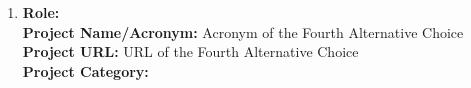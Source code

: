 \documentclass[runningheads]{llncs}
\begin{document}
\begin{description}
\begin{enumerate}
       \item \textbf{Role:}
\\
                \textbf{Project Name/Acronym:} Acronym of the Fourth Alternative Choice\\
                \textbf{Project URL:} URL of the Fourth Alternative Choice\\
                \textbf{Project Category:} %
    \end{enumerate}
\end{description}
%
\end{document}
